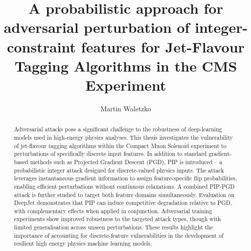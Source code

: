 \documentclass[12pt]{caltech_thesis}
\begin{document}
\title{\textbf{A probabilistic approach for adversarial perturbation of integer-constraint features for Jet-Flavour Tagging Algorithms in the CMS Experiment}}
\author{Martin Waletzko}




\maketitle

\begin{abstract}

Adversarial attacks pose a significant challenge to the robustness of deep-learning models used in high-energy physics analyses. This thesis investigates the vulnerability of jet-flavour tagging algorithms within the Compact Muon Solenoid experiment to perturbations of specifically discrete input features. In addition to standard gradient-based methods such as Projected Gradient Descent (PGD), PIP is introduced – a probabilistic integer attack designed for discrete-valued physics inputs. The attack leverages instantaneous gradient information to assign feature-specific flip probabilities, enabling efficient perturbations without continuous relaxations. A combined PIP-PGD attack is further studied to target both feature domains simultaneously. Evaluation on DeepJet demonstrates that PIP can induce competitive degradation relative to PGD, with complementary effects when applied in conjunction. Adversarial training experiments show improved robustness to the targeted attack types, though with limited generalisation across unseen perturbations. These results highlight the importance of accounting for discrete-feature vulnerabilities in the development of resilient high energy physics machine learning models.

\vfill
\noindent{}

\end{abstract}
\end{document}
